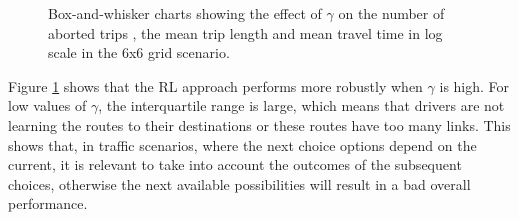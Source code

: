 \documentclass{RITA}
\begin{document}
\begin{figure}
  \centering
  \caption{Box-and-whisker charts showing the effect of $\gamma$ on the number of aborted trips , the mean trip length  and mean travel time in log scale  in the 6x6 grid scenario.}
  \label{fig:qLearningGamma-grid}
\end{figure}

Figure \ref{fig:qLearningGamma-grid} shows that the RL approach performs more robustly when $\gamma$ is high. For low values of $\gamma$, the interquartile range is large, which means that drivers are not learning the routes to their destinations or these routes have too many links. This shows that, in traffic scenarios, where the next choice options depend on the current, it is relevant to take into account the outcomes of the subsequent choices, otherwise the next available possibilities will result in a bad overall performance.
\end{document}
